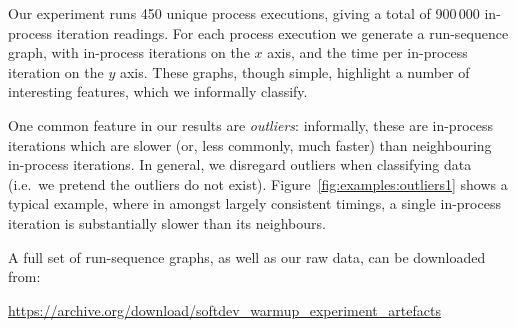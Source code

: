 \documentclass[a4paper,UKenglish]{lipics}
\begin{document}
Our experiment runs 450 unique process executions, giving a total of 900\,000
in-process iteration readings. For each process execution we generate a
run-sequence graph, with in-process iterations on the $x$ axis, and the time
per in-process iteration on the $y$ axis.
These graphs, though simple, highlight a number of
interesting features, which we informally classify.

One common feature in our results are \emph{outliers}: informally, these are
in-process iterations which are slower (or, less commonly, much
faster) than neighbouring in-process iterations. In general, we disregard outliers
when classifying data (i.e.~we pretend the outliers do not exist). Figure~\ref{fig:examples:outliers1}
shows a typical
example, where in amongst largely consistent timings, a single in-process
iteration is substantially slower than its neighbours.

A full set of run-sequence graphs, as well as our raw data, can be downloaded from:
\vspace{-.5em}
\begin{center}
\url{https://archive.org/download/softdev_warmup_experiment_artefacts}
\end{center}
\end{document}
